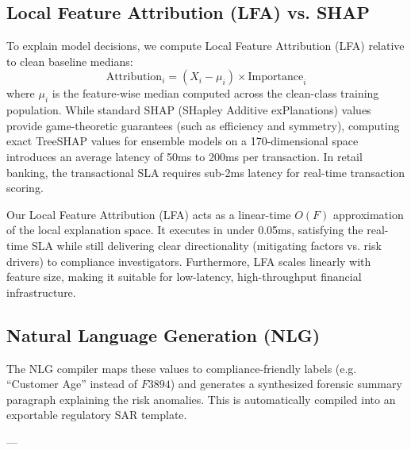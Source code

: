 \documentclass[11pt,a4paper]{article}
\begin{document}
\subsection{Local Feature Attribution (LFA) vs. SHAP}
To explain model decisions, we compute Local Feature Attribution (LFA) relative to clean baseline medians:
\begin{equation}
\text{Attribution}_i = (X_i - \mu_i) \times \text{Importance}_i
\end{equation}
where $\mu_i$ is the feature-wise median computed across the clean-class training population. While standard SHAP (SHapley Additive exPlanations) values provide game-theoretic guarantees (such as efficiency and symmetry), computing exact TreeSHAP values for ensemble models on a 170-dimensional space introduces an average latency of 50ms to 200ms per transaction. In retail banking, the transactional SLA requires sub-2ms latency for real-time transaction scoring. 

Our Local Feature Attribution (LFA) acts as a linear-time $O(F)$ approximation of the local explanation space. It executes in under 0.05ms, satisfying the real-time SLA while still delivering clear directionality (mitigating factors vs. risk drivers) to compliance investigators. Furthermore, LFA scales linearly with feature size, making it suitable for low-latency, high-throughput financial infrastructure.

\subsection{Natural Language Generation (NLG)}
The NLG compiler maps these values to compliance-friendly labels (e.g. ``Customer Age'' instead of $F3894$) and generates a synthesized forensic summary paragraph explaining the risk anomalies. This is automatically compiled into an exportable regulatory SAR template.

---

\end{document}
